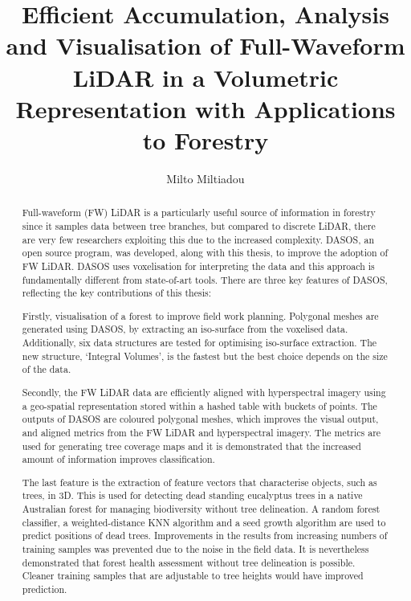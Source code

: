 \documentclass[11pt,nofootinbib]{report}
\title{Efficient Accumulation, Analysis and Visualisation of Full-Waveform LiDAR in a Volumetric Representation with Applications to Forestry}
\author{Milto Miltiadou}
\begin{document}
	\maketitle
 		
\begin{abstract}	
   

         \par Full-waveform (FW) LiDAR is a particularly useful source of information in forestry since it samples data between tree branches, but compared to discrete LiDAR, there are very few researchers exploiting this due to the increased complexity. DASOS, an open source program, was developed, along with this thesis, to improve the adoption of FW LiDAR. DASOS uses voxelisation for interpreting the data and this approach is fundamentally different from state-of-art tools. There are three key features of DASOS, reflecting the key contributions of this thesis:
         \par Firstly, visualisation of a forest to improve field work planning.  Polygonal meshes are generated using DASOS, by extracting an iso-surface from the voxelised data. Additionally, six data structures are tested for optimising iso-surface extraction. The new structure, `Integral Volumes', is the fastest but the best choice depends on the size of the data.
         \par Secondly, the FW LiDAR data are efficiently aligned with hyperspectral imagery using a geo-spatial representation stored within a hashed table with buckets of points. The outputs of DASOS are coloured polygonal meshes, which improves the visual output, and aligned metrics from the FW LiDAR and hyperspectral imagery. The metrics are used for generating tree coverage maps and it is demonstrated that the increased amount of information improves classification.
         \par The last feature is the extraction of feature vectors that characterise objects, such as trees, in 3D. This is used for detecting dead standing eucalyptus trees in a native Australian forest for managing biodiversity without tree delineation. A random forest classifier, a weighted-distance KNN algorithm and a seed growth algorithm are used to predict positions of dead trees. Improvements in the results from increasing numbers of training samples was prevented due to the noise in the field data. It is nevertheless demonstrated that forest health assessment without tree delineation is possible. Cleaner training samples that are adjustable to tree heights would have improved prediction.
  
    
    
     \thispagestyle{empty}
\end{abstract}
\end{document}
